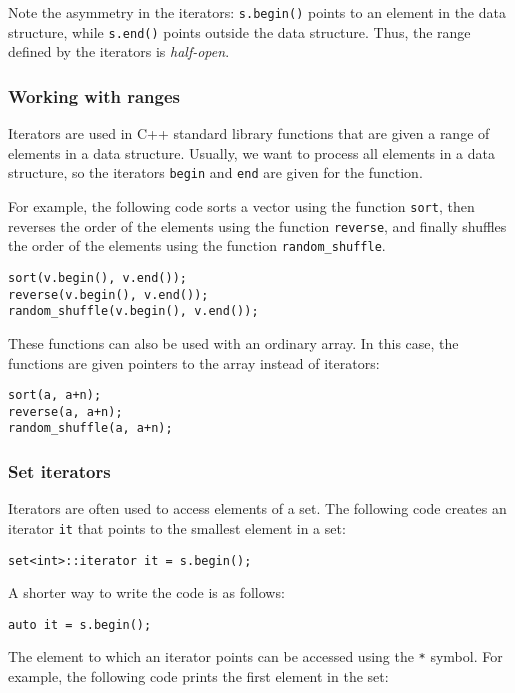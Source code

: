 Note the asymmetry in the iterators:
\texttt{s.begin()} points to an element in the data structure,
while \texttt{s.end()} points outside the data structure.
Thus, the range defined by the iterators is \emph{half-open}.

\subsubsection{Working with ranges}

Iterators are used in C++ standard library functions
that are given a range of elements in a data structure.
Usually, we want to process all elements in a
data structure, so the iterators
\texttt{begin} and \texttt{end} are given for the function.

For example, the following code sorts a vector
using the function \texttt{sort},
then reverses the order of the elements using the function
\texttt{reverse}, and finally shuffles the order of
the elements using the function \texttt{random\_shuffle}.


\begin{lstlisting}
sort(v.begin(), v.end());
reverse(v.begin(), v.end());
random_shuffle(v.begin(), v.end());
\end{lstlisting}

These functions can also be used with an ordinary array.
In this case, the functions are given pointers to the array
instead of iterators:

\newpage
\begin{lstlisting}
sort(a, a+n);
reverse(a, a+n);
random_shuffle(a, a+n);
\end{lstlisting}

\subsubsection{Set iterators}

Iterators are often used to access
elements of a set.
The following code creates an iterator
\texttt{it} that points to the smallest element in a set:
\begin{lstlisting}
set<int>::iterator it = s.begin();
\end{lstlisting}
A shorter way to write the code is as follows:
\begin{lstlisting}
auto it = s.begin();
\end{lstlisting}
The element to which an iterator points
can be accessed using the \texttt{*} symbol.
For example, the following code prints
the first element in the set:

